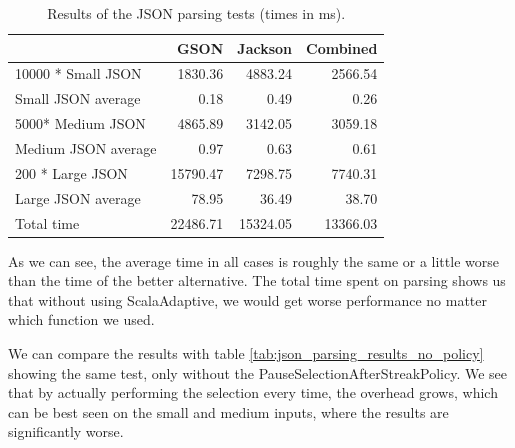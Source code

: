 \begin{table}[h!]
\captionsetup{justification=centering,margin=0.5cm}
\bgroup
\def\arraystretch{1.5}%
\begin{center}
	\begin{tabular}{ | l | r | r | r | }
		\hline
		& \textbf{GSON} & \textbf{Jackson} & \textbf{Combined} \\ \hline
		10000 * Small JSON & 1830.36 & 4883.24 & 2566.54 \\ \hline	
		Small JSON average & 0.18 & 0.49 & 0.26 \\ \hline	
		5000* Medium JSON & 4865.89 & 3142.05 & 3059.18 \\ \hline	
		Medium JSON average & 0.97 & 0.63 & 0.61 \\ \hline	
		200 * Large JSON & 15790.47 & 7298.75 & 7740.31 \\ \hline	
		Large JSON average & 78.95 & 36.49 & 38.70 \\ \hline
		Total time & 22486.71 & 15324.05 & 13366.03 \\
		\hline
	\end{tabular}
\end{center}
\egroup
\caption{Results of the JSON parsing tests (times in ms).}
\label{tab:json_parsing_results}
\end{table}

As we can see, the average time in all cases is roughly the same or a little worse than the time of the better alternative. The total time spent on parsing shows us that without using ScalaAdaptive, we would get worse performance no matter which function we used.

We can compare the results with table \ref{tab:json_parsing_results_no_policy} showing the same test, only without the PauseSelectionAfterStreakPolicy. We see that by actually performing the selection every time, the overhead grows, which can be best seen on the small and medium inputs, where the results are significantly worse.

